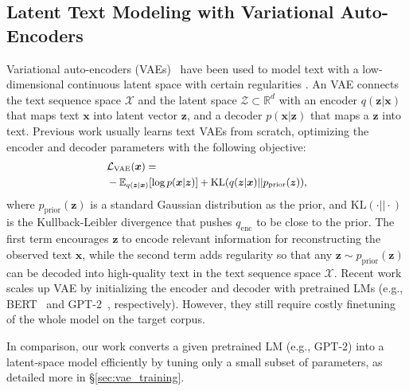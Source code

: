 \documentclass[11pt]{article}
\begin{document}
\subsection{Latent Text Modeling with Variational Auto-Encoders}
\label{sec:bg_vae}
Variational auto-encoders (VAEs)~\cite{DBLP:journals/corr/KingmaW13,DBLP:conf/icml/RezendeMW14} have been used to model text with a low-dimensional continuous latent space with certain regularities \citep{DBLP:conf/conll/BowmanVVDJB16,hu2017toward}. An VAE connects the text sequence space $\mathcal{X}$ and the latent space $\mathcal{Z}\subset\mathbb{R}^d$ with an encoder $q(\bm z|\bm x)$ that maps text $\bm{x}$ into latent vector $\bm{z}$, and a decoder $p(\bm x|\bm z)$ that maps a $\bm{z}$ into text. Previous work usually learns text VAEs from scratch, optimizing the encoder and decoder parameters with the following objective:
\begin{equation}
\small
\setlength\abovedisplayskip{0.2cm}
\setlength\belowdisplayskip{0.2cm}
\label{eq:vae_loss}
    \begin{split}
        &\mathcal{L}_{\text{VAE}}(\bm x) = \\
        &-\mathbb{E}_{q(\bm z|\bm x)}[\log p(\bm x|\bm z)]
        + \text{KL}(q(\bm z|\bm x) || p_{\text{prior}}(\bm z)),
    \end{split}
\end{equation}
where $p_{\text{prior}}(\bm{z})$ is a standard Gaussian distribution as the prior, and $\text{KL}(\cdot||\cdot)$ is the Kullback-Leibler divergence that pushes $q_{\text{enc}}$ to be close to the prior. The first term encourages $\bm{z}$ to encode relevant information for reconstructing the observed text $\bm{x}$, while the second term adds regularity so that any $\bm{z} \sim p_{\text{prior}}(\bm{z})$ can be decoded into high-quality text in the text sequence space $\mathcal{X}$.
Recent work \citep{li-etal-2020-optimus,hu2021causal} scales up VAE by initializing the encoder and decoder with pretrained LMs (e.g., BERT~\cite{bert} and GPT-2~\cite{gpt2}, respectively). However, they still require costly finetuning of the whole model on the target corpus. 

In comparison, our work converts a given pretrained LM (e.g., GPT-2) into a latent-space model efficiently by tuning only a small subset of parameters, as detailed more in \S\ref{sec:vae_training}.
\end{document}
